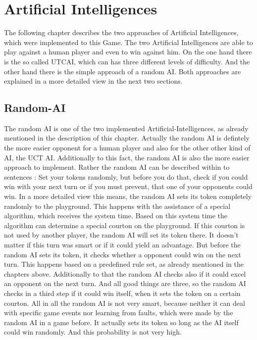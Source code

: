 \documentclass[german]{report}
\begin{document}
\chapter{Artificial Intelligences}
\label{sec:artificIntelligences}
The following chapter describes the two approaches of Artificial Intelligences, which were implemented to this Game. The two Artificial Intelligences are able 
to play against a human player and even to win against him. On the one hand there is the so called UTCAI, which can has three different
levels of difficulty. And the other hand there is the simple approach of a random AI. Both approaches are explained in a more detailed view in the next two
sections. 



\section{Random-AI}
The random AI is one of the two implemented Artificial-Intelligences, as already mentioned in the description of this chapter. 
Actually the random AI is defintely the more easier opponent for a human player and also for the other other kind of AI, the UCT AI. 
Additionally to this fact, the random AI is also the more easier approach to implement. Rather the random AI can be described within to sentences : 
Set your tokens randomly, but before you do that, check if you could  win with your next turn or if you must prevent, that one of your opponents could win. 
In a more detailed view this means, the random AI sets its token completely randomly to the playground. This happens with the assistance of a special algorithm, 
which receives the system time. Based on this system time the algorithm can determine a special courton on the playground. If this courton is not used by 
another player, the random AI will set its token there. It doesn't matter if this turn was smart or if it could yield an advantage. But before the random AI 
sets its token, it checks whether a opponent could win on the next turn. This happens based on a predefined rule set, as already mentioned in the chapters above. 
Additionally to that the random AI checks also if it could excel an opponent on the next turn. And all good things are three, so the random AI checks in a third 
step if it could win itself, when it sets the token on a certain courton. All in all the random AI is not very smart, because neither it can deal with specific 
game events nor learning from faults, which were made by the random AI in a game before. It actually sets its token so long as the AI itself could win randomly. 
And this probability is not very high. 
\end{document}
